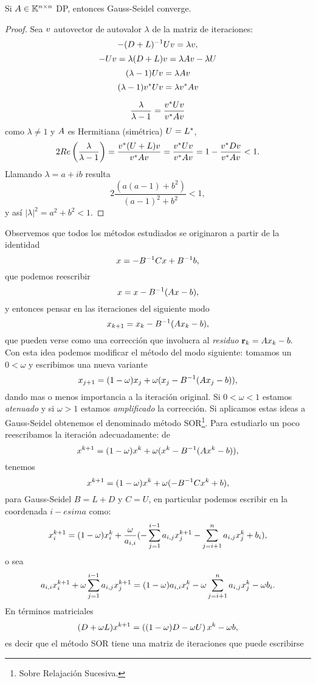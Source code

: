 \tcc
\begin{prop}

 Si $\Ab\in\Knn$  DP, entonces Gauss-Seidel converge.
\end{prop}
\etcc
\begin{proof} Sea $\vb$ autovector de autovalor $\lambda$ de la matriz de iteraciones:
$$
-(\Db+\Lb)^{-1}\Ub\vb=\lambda\vb,
$$
$$
-\Ub\vb=\lambda(\Db+\Lb)\vb=\lambda \Ab \vb-\lambda \Ub
$$
$$
(\lambda-1)\Ub\vb=\lambda \Ab\vb
$$
$$
(\lambda-1)\vb^*\Ub\vb=\lambda \vb^*\Ab\vb
$$

$$
\frac{\lambda}{\lambda-1}=\frac{\vb^*\Ub\vb}{\vb^*\Ab\vb}
$$
como $\lambda\neq 1$ y $\Ab$ es Hermitiana (simétrica) $\Ub=\Lb^*$,
$$
2Re\left(\frac{\lambda}{\lambda-1}\right)=\frac{\vb^*(\Ub+\Lb)\vb}{\vb^*\Ab\vb}=\frac{\vb^*\Ub\vb}{\vb^*\Ab\vb}=1-\frac{\vb^*\Db\vb}{\vb^*\Ab\vb}<1.
$$
Llamando $\lambda=a+ib$ resulta
$$
2\frac{(a(a-1)+b^2)}{(a-1)^2+b^2}<1,
$$
y así
$|\lambda|^2=a^2+b^2<1.$
\end{proof}
Observemos que todos los métodos estudiados se originaron a partir de la identidad
$$
\xb=-\Bb^{-1}\Cb\xb+\Bb^{-1}\bb,
$$
que podemos reescribir
$$
\xb=\xb-\Bb^{-1}(\Ab\xb-\bb),
$$
y entonces pensar en las iteraciones del siguiente modo
$$
\xb_{k+1}=\xb_k-\Bb^{-1}(\Ab\xb_k-\bb),
$$
que pueden verse como una corrección que involucra al \emph{residuo} $\rb_k=\Ab\xb_k-\bb.$ Con esta idea podemos modificar el método del modo siguiente: tomamos un  $0<\omega$ y escribimos una nueva variante
$$
\xb_{j+1}=(1-\omega)\xb_j+
\omega(\xb_j-\Bb^{-1}(\Ab\xb_j-\bb)),
$$
dando mas o menos importancia a la iteración original. Si $0<\omega<1$ estamos \emph{atenuado} y si $\omega>1$ estamos  \emph{amplificado} la corrección. Si aplicamos estas ideas a Gauss-Seidel obtenemos el denominado método SOR\footnote{Sobre Relajación Sucesiva.}. Para estudiarlo un poco reescribamos la iteración adecuadamente: de
$$
\xb^{k+1}=(1-\omega)\xb^k+
\omega(\xb^k-\Bb^{-1}(\Ab\xb^k-\bb)),
$$
tenemos
$$
\xb^{k+1}=(1-\omega)\xb^k+
\omega(-\Bb^{-1}\Cb\xb^k+\bb),
$$
para Gauss-Seidel $B=L+D$ y $C=U$, en particular podemos escribir en la coordenada $i-esima$ como:
$$
\xb^{k+1}_i=(1-\omega)\xb^k_i+
\frac{\omega}{a_{i,i}}(-\sum_{j=1}^{i-1}a_{i,j}\xb_j^{k+1}-\sum_{j=i+1}^{n}a_{i,j}\xb_j^k+\bb_i),
$$
o sea
$$
a_{i,i}\xb^{k+1}_i+\omega\sum_{j=1}^{i-1}a_{i,j}\xb_j^{k+1}=(1-\omega)a_{i,i}\xb^k_i-
\omega\sum_{j=i+1}^{n}a_{i,j}\xb_j^k -\omega\bb_i.
$$
En términos matriciales
$$
(\Db+\omega \Lb)\xb^{k+1}=\left((1-\omega)\Db-\omega\Ub\right)\xb^{k}-\omega \bb,
$$
es decir que el método SOR tiene una matriz de iteraciones que puede escribirse
